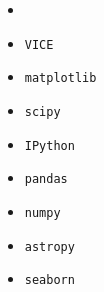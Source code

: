\documentclass[12pt,oneside,letterpaper]{report}
\newcommand{\VICE}{\texttt{VICE}}
\begin{document}
\begin{itemize}
    \item \citet{OhioSupercomputerCenter1987}
    \item \VICE~\citep{JW20, james+21}
    \item \texttt{matplotlib} \citep{matplotlib}
    \item \texttt{scipy} \citep{scipy}
    \item \texttt{IPython} \citep{ipy}
    \item \texttt{pandas} \citep{pandas}
    \item \texttt{numpy} \citep{numpy}
    \item \texttt{astropy} \citep{astropy:2013, astropy:2018, astropy:2022}
    \item \texttt{seaborn} \citep{seaborn}
\end{itemize}




\renewcommand*{\arraystretch}{1.25}
\glsaddall[types={symbols}]
\renewcommand{\glslongextraSymDescTabularHeader}{}
\renewcommand{\glslongextraSymDescTabularFooter}{}

\printunsrtglossary[type=symbols,nonumberlist,style=long-sym-desc]


\renewcommand*{\arraystretch}{1}
\printglossary[type=models,nonumberlist]


\printglossary[type=\acronymtype,nonumberlist]


\printglossary
\end{document}
